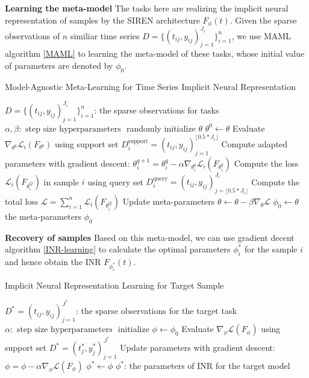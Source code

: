 \documentclass{article}
\begin{document}
\textbf{Learning the meta-model}
The tasks here are realizing the implicit neural representation of samples by the SIREN architecture $F_\phi(t)$.
Given the sparse observations of $n$ similiar time series $D=\{(t_{ij},y_{ij})_{j=1}^{J_i}\}_{i=1}^n$,
we use MAML algorithm \ref{MAML} to learning the meta-model of these tasks, 
whose initial value of parameters are denoted by $\phi_0$. 
\begin{algorithm}[htb]
	\renewcommand{\algorithmicrequire}{\textbf{Input:}}
	\renewcommand{\algorithmicensure}{\textbf{Output:}}
	\caption{Model-Agnostic Meta-Learning for Time Series Implicit Neural Representation}
	\label{MAML}
	\begin{algorithmic}
    \REQUIRE $D=\{(t_{ij},y_{ij})_{j=1}^{J_i}\}_{i=1}^n$: the sparse observations for tasks
    \REQUIRE $\alpha, \beta: \text { step size hyperparameters }$
		\STATE randomly initialize $\theta$
        \STATE $\theta^0 \gets \theta$
          \STATE Evaluate $\nabla_{\theta^q} \mathcal{L}_{i}\left(F_{\theta^q}\right)$ using support set $D_i^{\text{support}}=(t_{ij},y_{ij})_{j=1}^{\lfloor 0.5*J_i\rfloor }$
          \STATE Compute adapted parameters with gradient descent:
          $\theta_i^{q+1}=\theta_i^q-\alpha \nabla_{\theta_i^q} \mathcal{L}_{i}\left(F_{\theta_i^q}\right)$
        \ENDFOR
        \STATE Compute the loss $\mathcal{L}_{i}\left(F_{\theta_i^Q}\right)$ in sample $i$ using query set $D_i^{\text{query}}=(t_{ij},y_{ij})_{j=\lfloor 0.5*J_i\rfloor }^{J_i}$
      \ENDFOR
      \STATE Compute the total loss $\mathcal{L} = \sum_{i=1}^n \mathcal{L}_{i}\left(F_{\theta_i^Q}\right)$
      \STATE Update meta-parameters $\theta \leftarrow \theta-\beta \nabla_\theta \mathcal{L} $
    \ENDWHILE 
    \STATE $\phi_0 \gets \theta$
		\ENSURE the meta-parameters $\phi_0$
  \end{algorithmic}  
\end{algorithm}


\textbf{Recovery of samples}
Based on this meta-model, we can use gradient decent algorithm \ref{INR-learning} to calculate the optimal parameters $\phi^*_i$ for the sample $i$ and hence obtain the INR $F_{\phi^*_i}(t)$. 
\begin{algorithm}[htb]
	\renewcommand{\algorithmicrequire}{\textbf{Input:}}
	\renewcommand{\algorithmicensure}{\textbf{Output:}}
	\caption{Implicit Neural Representation Learning for Target Sample}
	\label{INR-learning}
	\begin{algorithmic}
    \REQUIRE $D^*=(t_{ij},y_{ij})_{j=1}^{J^*}$: the sparse observations for the target task
    \REQUIRE $\alpha: \text { step size hyperparameters }$
		\STATE initialize $\phi \gets \phi_0$
      \STATE Evaluate $\nabla_{\phi} \mathcal{L}\left(F_{\phi}\right)$ using support set $D^*=(t_{j}^*,y_{j}^*)_{j=1}^{J^*}$
      \STATE Update parameters with gradient descent:
      $\phi=\phi-\alpha \nabla_{\phi} \mathcal{L}\left(F_{\phi}\right)$
    \ENDWHILE 
    \STATE $\phi^* \gets \phi$
		\ENSURE $\phi^*$: the parameters of INR for the target model 
  \end{algorithmic}  
\end{algorithm}
\end{document}
